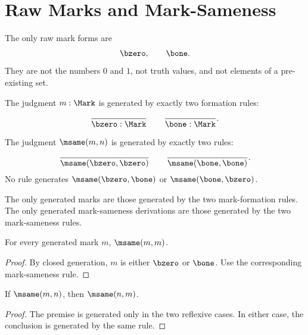 \chapter{Raw Marks and Mark-Sameness}
\label{ch:core-raw-marks-and-mark-sameness}

\begin{definition}
\label{def:raw-marks}
The only raw mark forms are
$$
\bzero,\qquad \bone.
$$
They are not the numbers \(0\) and \(1\), not truth values, and not elements of a pre-existing set.
\end{definition}

\begin{kernelrule}
The judgment \(m:\Mark\) is generated by exactly two formation rules:
$$
\frac{}{\bzero:\Mark}
\qquad
\frac{}{\bone:\Mark}.
$$
\end{kernelrule}

\begin{definition}
\label{def:internal-mark-sameness}
The judgment \(\msame(m,n)\) is generated by exactly two rules:
$$
\frac{}{\msame(\bzero,\bzero)}
\qquad
\frac{}{\msame(\bone,\bone)}.
$$
No rule generates \(\msame(\bzero,\bone)\) or \(\msame(\bone,\bzero)\).
\end{definition}

\begin{axiomlike}
The only generated marks are those generated by the two mark-formation rules. The only generated mark-sameness derivations are those generated by the two mark-sameness rules.
\end{axiomlike}

\begin{lemma}
For every generated mark \(m\), \(\msame(m,m)\).
\end{lemma}
\begin{proof}
By closed generation, \(m\) is either \(\bzero\) or \(\bone\). Use the corresponding mark-sameness rule.
\end{proof}

\begin{lemma}
If \(\msame(m,n)\), then \(\msame(n,m)\).
\end{lemma}
\begin{proof}
The premise is generated only in the two reflexive cases. In either case, the conclusion is generated by the same rule.
\end{proof}

